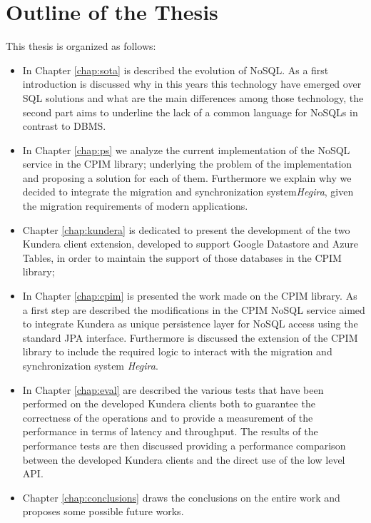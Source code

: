 \section*{Outline of the Thesis}
This thesis is organized as follows: 
\begin{itemize}
\item In Chapter \ref{chap:sota} is described the evolution of NoSQL. As a first introduction is discussed why in this years this technology have emerged over SQL solutions and what are the main differences among those technology, the second part aims to underline the lack of a common language for NoSQLs in contrast to DBMS.
\item In Chapter \ref{chap:ps} we analyze the current implementation of the NoSQL service in the CPIM library; underlying the problem of the implementation and proposing a solution for each of them. Furthermore we explain why we decided to integrate the migration and synchronization system\textit{Hegira}, given the migration requirements of modern applications.
\item Chapter \ref{chap:kundera} is dedicated to present the development of the two Kundera client extension, developed to support Google Datastore and Azure Tables, in order to maintain the support of those databases in the CPIM library;
\item In Chapter \ref{chap:cpim} is presented the work made on the CPIM library. As a first step are described the modifications in the CPIM NoSQL service aimed to integrate Kundera as unique persistence layer for NoSQL access using the standard JPA interface. Furthermore is discussed the extension of the CPIM library to include the required logic to interact with the migration and synchronization system \textit{Hegira}.
\item In Chapter \ref{chap:eval} are described the various tests that have been performed on the developed Kundera clients both to guarantee the correctness of the operations and to provide a measurement of the performance in terms of latency and throughput. The results of the performance tests are then discussed providing a performance comparison between the developed Kundera clients and the direct use of the low level API.
\item Chapter \ref{chap:conclusions} draws the conclusions on the entire work and proposes some possible future works.
\end{itemize}


